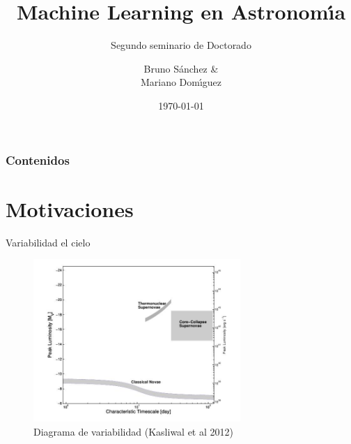 \documentclass[11pt]{beamer}
\title{Machine Learning en Astronom\'{\i}a}
\subtitle{Segundo seminario de Doctorado}
\author{Bruno S\'anchez \& \\
Mariano Dom\'{\i}guez}
\institute{IATE - FaMAFyC} %
\date{\today}
\begin{document}
\begin{frame}[plain]
\maketitle
\end{frame}


\begin{frame}
\frametitle{Contenidos}
\tableofcontents%
\end{frame}


\section{Motivaciones}

\begin{frame}{Variabilidad el cielo}
    \begin{figure}
        \centering
        \includegraphics[width=0.7\textwidth]{./images/imgs_seminario1/diag1.jpeg}
        \caption{Diagrama de variabilidad (Kasliwal et al 2012)}
        \label{fig:diag_vacio}
    \end{figure}
\end{frame}
\end{document}
